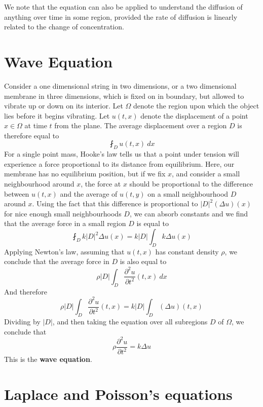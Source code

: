We note that the equation can also be applied to understand the diffusion of anything over time in some region, provided the rate of diffusion is linearly related to the change of concentration.

\section{Wave Equation}

Consider a one dimensional string in two dimensions, or a two dimensional membrane in three dimensions, which is fixed on in boundary, but allowed to vibrate up or down on its interior. Let $\Omega$ denote the region upon which the object lies before it begins vibrating. Let $u(t,x)$ denote the displacement of a point $x \in \Omega$ at time $t$ from the plane. The average displacement over a region $D$ is therefore equal to
%
\[ \fint_D u(t,x)\ dx \]
%
For a single point mass, Hooke's law tells us that a point under tension will experience a force proportional to its distance from equilibrium. Here, our membrane has no equilibrium position, but if we fix $x$, and consider a small neighbourhood around $x$, the force at $x$ should be proportional to the difference between $u(t,x)$ and the average of $u(t,y)$ on a small neighbourhood $D$ around $x$. Using the fact that this difference is proportional to $|D|^2 (\Delta u)(x)$ for nice enough small neighbourhoods $D$, we can absorb constants and we find that the average force in a small region $D$ is equal to
%
\[ \fint_D k |D|^2 \Delta u(x) = k |D| \int_D k \Delta u(x) \]
%
Applying Newton's law, assuming that $u(t,x)$ has constant density $\rho$, we conclude that the average force in $D$ is also equal to
%
\[ \rho |D| \int_D \frac{\partial^2 u}{\partial t^2}(t,x) \ dx \]
%
And therefore
%
\[ \rho |D| \int_D \frac{\partial^2 u}{\partial t^2}(t,x) = k |D| \int_D (\Delta u)(t,x) \]
%
Dividing by $|D|$, and then taking the equation over all subregions $D$ of $\Omega$, we conclude that
%
\[ \rho \frac{\partial^2 u}{\partial t^2} = k \Delta u \]
%
This is the {\bf wave equation}.

\section{Laplace and Poisson's equations}

